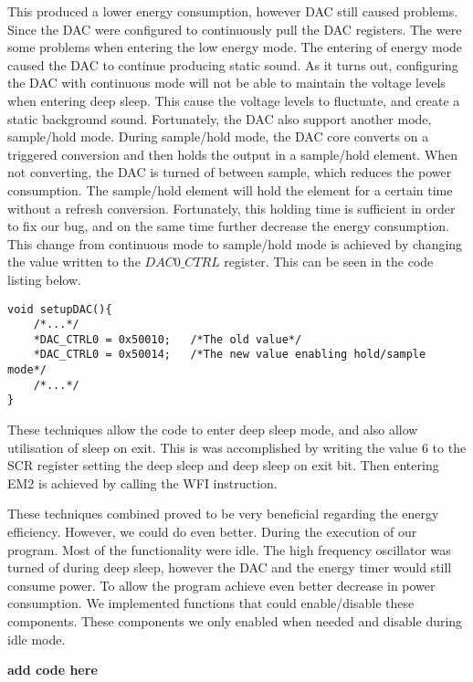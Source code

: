 This produced a lower energy consumption, however DAC still caused problems. Since the DAC were configured to continuously pull the DAC registers. The were some problems when entering the low energy mode. The entering of energy mode caused the DAC to continue producing static sound. As it turns out, configuring the DAC with continuous mode will not be able to maintain the voltage levels when entering deep sleep. This cause the voltage levels to fluctuate, and create a static background sound. Fortunately, the DAC also support another mode, sample/hold mode. During sample/hold mode, the DAC core converts on a triggered conversion and then holds the output in a sample/hold element. When not converting, the DAC is turned of between sample, which reduces the power consumption. The sample/hold element will hold the element for a certain time without a refresh conversion\cite{EFM32GG-rm}. Fortunately, this holding time is sufficient in order to fix our bug, and on the same time further decrease the energy consumption. This change from continuous mode to sample/hold mode is achieved by changing the value written to the $DAC0\_CTRL$ register. This can be seen in the code listing below. 


\begin{lstlisting}
void setupDAC(){
    /*...*/
    *DAC_CTRL0 = 0x50010;   /*The old value*/
    *DAC_CTRL0 = 0x50014;   /*The new value enabling hold/sample mode*/
    /*...*/
}
\end{lstlisting}

These techniques allow the code to enter deep sleep mode, and also allow utilisation of sleep on exit. This is was accomplished by writing the value 6 to the SCR register setting the deep sleep and deep sleep on exit bit. Then entering EM2 is achieved by calling the WFI instruction.

These techniques combined proved to be very beneficial regarding the energy efficiency. However, we could do even better. During the execution of our program. Most of the functionality were idle. The high frequency oscillator was turned of during deep sleep, however the DAC and the energy timer would still consume power. To allow the program achieve even better decrease in power consumption. We implemented functions that could enable/disable these components. These components we only enabled when needed and disable during idle mode. 

{\bf add code here}


 

  





   



  
       

 



